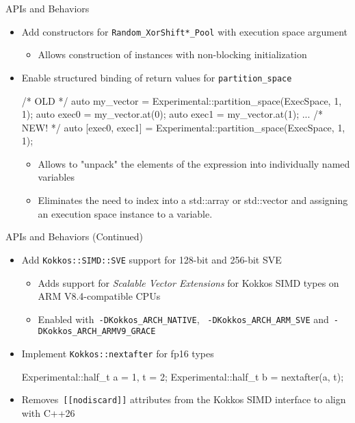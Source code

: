 \begin{frame}[fragile]{APIs and Behaviors}
 \begin{itemize}
  \item Add constructors for \texttt{Random\_XorShift*\_Pool} with execution space argument
      \begin{itemize}
      \item Allows construction of instances with non-blocking initialization
    \end{itemize}
   \item Enable structured binding of return values for \texttt{partition\_space}
\begin{code}[keywords={partition_space}]
/* OLD */
auto my_vector =  Experimental::partition_space(ExecSpace, 1, 1);
auto exec0 = my_vector.at(0);
auto exec1 = my_vector.at(1);
...
/* NEW! */
auto [exec0, exec1] = Experimental::partition_space(ExecSpace, 1, 1);
\end{code}
    \begin{itemize}
      \item Allows to "unpack" the elements of the expression into individually named variables
      \item Eliminates the need to index into a std::array or std::vector and assigning an execution space instance to a variable.
      \end{itemize}
 \end{itemize}
\end{frame}


\begin{frame}[fragile]{APIs and Behaviors (Continued)}
 \begin{itemize}
     \item Add \texttt{Kokkos::SIMD::SVE} support for 128-bit and 256-bit SVE 
     \begin{itemize}
      \item Adds support for \emph{Scalable Vector Extensions} for Kokkos SIMD types on ARM V8.4-compatible CPUs
      \item Enabled with~\texttt{-DKokkos\_ARCH\_NATIVE}, ~\texttt{-DKokkos\_ARCH\_ARM\_SVE} and~\texttt{-DKokkos\_ARCH\_ARMV9\_GRACE}
     \end{itemize}
     \item Implement \texttt{Kokkos::nextafter} for fp16 types
\begin{code}[keywords={nextafter}]
Experimental::half_t a = 1, t = 2;
Experimental::half_t b = nextafter(a, t);
\end{code}
        \item Removes~\texttt{[[nodiscard]]} attributes from the Kokkos SIMD interface to align with C++26
 \end{itemize}
\end{frame}

